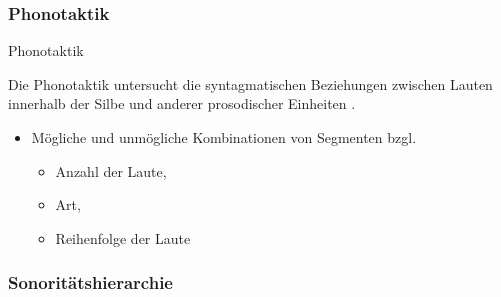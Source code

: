 \begin{frame}
\frametitle{Phonotaktik}

\begin{block}{Phonotaktik}

Die Phonotaktik untersucht die syntagmatischen Beziehungen zwischen Lauten innerhalb der Silbe und anderer prosodischer Einheiten \citep{Fuhrhop&Co13a}.

\end{block}

\begin{itemize}
	\item Mögliche und unmögliche Kombinationen von Segmenten bzgl.
	
	\begin{itemize}
		\item Anzahl der Laute,
		\item Art,
		\item Reihenfolge der Laute
	\end{itemize}

\end{itemize}

\end{frame}



\subsubsection{Sonoritätshierarchie}

